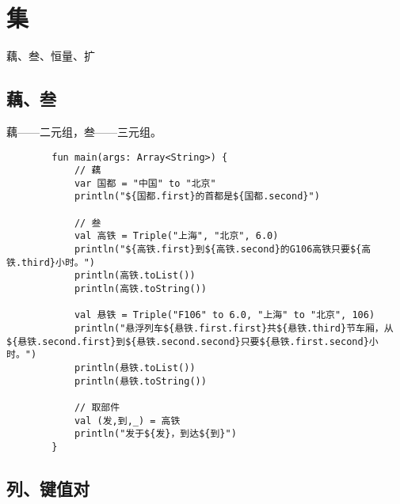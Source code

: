 \chapter{集}
藕、叁、恒量、扩

\section{藕、叁}
藕——二元组，叁——三元组。

    \begin{verbatim}
        fun main(args: Array<String>) {
            // 藕
            var 国都 = "中国" to "北京"
            println("${国都.first}的首都是${国都.second}")
        
            // 叁
            val 高铁 = Triple("上海", "北京", 6.0)
            println("${高铁.first}到${高铁.second}的G106高铁只要${高铁.third}小时。")
            println(高铁.toList())
            println(高铁.toString())
        
            val 悬铁 = Triple("F106" to 6.0, "上海" to "北京", 106)
            println("悬浮列车${悬铁.first.first}共${悬铁.third}节车厢，从${悬铁.second.first}到${悬铁.second.second}只要${悬铁.first.second}小时。")
            println(悬铁.toList())
            println(悬铁.toString())
        
            // 取部件
            val (发,到,_) = 高铁
            println("发于${发}，到达${到}")
        }        

    \end{verbatim}

\section{列、键值对}

